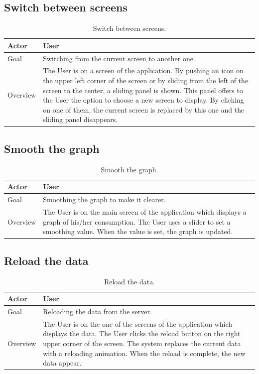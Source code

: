 \documentclass[a4paper, oneside, 11pt]{book}
\begin{document}
\newpage
\subsection{Switch between screens}

\begin{table}[h!]	
	\centering
	\begin{tabular}{|p{2cm}|p{8cm}|} \hline
		Actor	 	& User \\ \hline
		Goal	 	& Switching from the current screen to another one.
\\ \hline
		 Overview	& 
		 The User is on a screen of the application. By pushing an icon on the upper left corner of the screen or by sliding from the left of the screen to the center, a sliding panel is shown. This panel offers to the User the option to choose a new screen to display. By clicking on one of them, the current screen is replaced by this one and the sliding panel disappears.
\\ \hline
	\end{tabular}
	\caption{Switch between screens.}
\end{table}

\subsection{Smooth the graph}

\begin{table}[h!]	
	\centering
	\begin{tabular}{|p{2cm}|p{8cm}|} \hline
		Actor	 	& User \\ \hline
		Goal	 	& Smoothing the graph to make it clearer.
\\ \hline
		 Overview	& 
		 The User is on the main screen of the application which displays a graph of his/her consumption. The User uses a slider to set a smoothing value. When the value is set, the graph is updated.
\\ \hline
	\end{tabular}
	\caption{Smooth the graph.}
\end{table}

\subsection{Reload the data}

\begin{table}[h!]	
	\centering
	\begin{tabular}{|p{2cm}|p{8cm}|} \hline
		Actor	 	& User \\ \hline
		Goal	 	& Reloading the data from the server.
\\ \hline
		 Overview	& 
		 The User is on the one of the screens of the application which displays the data. The User clicks the reload button on the right upper corner of the screen. The system replaces the current data with a reloading animation. When the reload is complete, the new data appear.
\\ \hline
	\end{tabular}
	\caption{Reload the data.}
\end{table}
\end{document}
